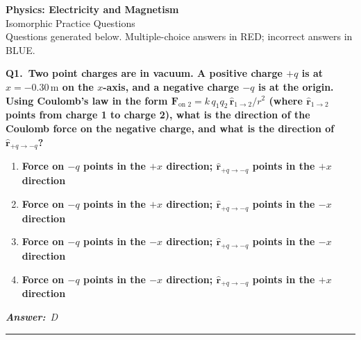 \documentclass[11pt]{article}
\newcommand{\QuestionStyle}[1]{{\large\bfseries\boldmath #1}}
\newcommand{\AnswerStyle}[1]{{\large\bfseries\boldmath #1}}
\newcommand{\ReasonStyle}[1]{{\normalsize #1}}
\newif\ifshowreason
\newcommand{\Correct}[2]{%
  \item \AnswerStyle{\textcolor{AnsRed}{#1}}%
  \ifshowreason\\[-0.2em]
    \ReasonStyle{\textcolor{AnsRed}{#2}}%
  \fi
}
\newcommand{\Wrong}[2]{%
  \item \AnswerStyle{\textcolor{WrongBlue}{#1}}%
  \ifshowreason\\[-0.2em]
    \ReasonStyle{\textcolor{WrongBlue}{#2}}%
  \fi
}
\newcommand{\QBlock}[4]{%
  \Needspace{8\baselineskip}%
  \noindent
  \begin{minipage}{\linewidth}
    \QuestionStyle{#1.~#2}

    \vspace{0.25em}
    \begin{enumerate}
      #3
    \end{enumerate}

    \vspace{0.1em}
    \noindent\textcolor{AnsRed}{\textit{\textbf{Answer:}~#4}}

    \vspace{0.25em}
    \hrule height 0.4pt
  \end{minipage}
  \vspace{0.75em}
}
\begin{document}
\begin{center}
{\huge \textbf{Physics: Electricity and Magnetism}}\\[0.25em]
{\Large Isomorphic Practice Questions}\\[0.25em]
{\large Questions generated below. Multiple-choice answers in RED; incorrect answers in BLUE.}
\end{center}

\vspace{0.75em}

\QBlock{Q1}{Two point charges are in vacuum. A positive charge $+q$ is at $x=-0.30\,\text{m}$ on the $x$-axis, and a negative charge $-q$ is at the origin. Using Coulomb's law in the form $\mathbf F_{\text{on }2}=k\,q_1q_2\,\hat{\mathbf r}_{1\to2}/r^2$ (where $\hat{\mathbf r}_{1\to2}$ points from charge 1 to charge 2), what is the direction of the Coulomb force on the negative charge, and what is the direction of $\hat{\mathbf r}_{+q\to -q}$?}{
  \Wrong{Force on $-q$ points in the $+x$ direction; $\hat{\mathbf r}_{+q\to -q}$ points in the $+x$ direction}{This treats the interaction as repulsive; opposite charges attract, so the force on $-q$ must point toward $+q$ (to the left).}
  \Wrong{Force on $-q$ points in the $+x$ direction; $\hat{\mathbf r}_{+q\to -q}$ points in the $-x$ direction}{This gets both directions wrong: $\hat{\mathbf r}_{+q\to -q}$ should point from $x=-0.30\,\text{m}$ to $0$, i.e. $+x$, and the force on $-q$ is attractive toward $-x$.}
  \Wrong{Force on $-q$ points in the $-x$ direction; $\hat{\mathbf r}_{+q\to -q}$ points in the $-x$ direction}{The force direction is correct, but the unit vector is defined from $+q$ (left) to $-q$ (at the origin), which is in the $+x$ direction, not $-x$.}
  \Correct{Force on $-q$ points in the $-x$ direction; $\hat{\mathbf r}_{+q\to -q}$ points in the $+x$ direction}{Because the charges are opposite, the force on $-q$ is attractive and points toward $+q$, i.e. in the $-x$ direction. The separation unit vector $\hat{\mathbf r}_{+q\to -q}$ points from $x=-0.30\,\text{m}$ to $0$, which is $+\hat{\mathbf i}$; since $q_1q_2<0$ in $\mathbf F=kq_1q_2\hat{\mathbf r}/r^2$, the force is opposite $\hat{\mathbf r}$, giving $-x$.}
}{D}
\end{document}

